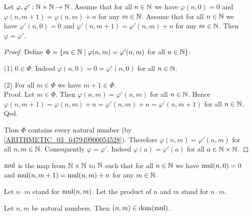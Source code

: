 \documentclass[10pt]{article}
\begin{document}
  \begin{forthel}
    \begin{lemma}
      Let $\varphi, \varphi' : \mathbb{N} \times \mathbb{N} \to \mathbb{N}$.
      Assume that for all $n \in \mathbb{N}$ we have $\varphi(n, 0) = 0$ and
      $\varphi(n, m + 1) = \varphi(n,m) + n$ for any $m \in \mathbb{N}$.
      Assume that for all $n \in \mathbb{N}$ we have $\varphi'(n, 0) = 0$ and
      $\varphi'(n, m + 1) = \varphi'(n,m) + n$ for any $m \in \mathbb{N}$.
      Then $\varphi = \varphi'$.
    \end{lemma}
    \begin{proof}
      Define $\Phi = \{ m \in \mathbb{N} \mid \varphi(n,m) = \varphi'(n,m)$ for
      all $n \in \mathbb{N} \}$.

      (1) $0 \in \Phi$.
      Indeed $\varphi(n,0) = 0 = \varphi'(n,0)$ for all $n \in \mathbb{N}$.

      (2) For all $m \in \Phi$ we have $m + 1 \in \Phi$. \\
      Proof.
        Let $m \in \Phi$.
        Then $\varphi(n,m) = \varphi'(n,m)$ for all $n \in \mathbb{N}$.
        Hence $\varphi(n, m + 1)
          = \varphi(n,m) + n
          = \varphi'(n,m) + n
          = \varphi'(n, m + 1)$
        for all $n \in \mathbb{N}$.
      Qed.

      Thus $\Phi$ contains every natural number (by \cref{ARITHMETIC_03_647949900054528}).
      Therefore $\varphi(n,m) = \varphi'(n,m)$ for all $n, m \in \mathbb{N}$.
      Consequently $\varphi = \varphi'$.
      Indeed $\varphi(a) = \varphi'(a)$ for all $a \in \mathbb{N} \times \mathbb{N}$.
    \end{proof}
  \end{forthel}

  \begin{forthel}
    \begin{definition}
      $\textrm{mul}$ is the map from $\mathbb{N} \times \mathbb{N}$ to $\mathbb{N}$ such that for all
      $n \in \mathbb{N}$ we have $\textrm{mul}(n, 0) = 0$ and $\textrm{mul}(n, m + 1) =
      \textrm{mul}(n, m) + n$ for any $m \in \mathbb{N}$.
    \end{definition}

    Let $n \cdot m$ stand for $\textrm{mul}(n, m)$.
    Let the product of $n$ and $m$ stand for $n \cdot m$.
  \end{forthel}

  \begin{forthel}
    \begin{lemma}
      Let $n, m$ be natural numbers.
      Then $(n,m) \in \operatorname{dom}(\textrm{mul})$.
    \end{lemma}
  \end{forthel}
\end{document}
